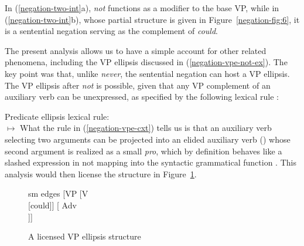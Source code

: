 \documentclass[output=paper
 	        ,biblatex
                ,babelshorthands
                ,newtxmath
                ,draftmode
                ,colorlinks, citecolor=brown
]{langscibook}
\begin{document}
\begin{exe}
\begin{xlist}
\begin{exe}
\begin{xlist}
\eal
\label{negation-two-int}
\zl
%
In (\ref{negation-two-int}a), \textit{not} functions as a modifier to
the base VP, while  in (\ref{negation-two-int}b), whose partial structure is
given in Figure~\ref{negation-fig:6}, it is a sentential
negation serving as the complement of \emph{could}.

The present analysis allows us to have a simple account for other related phenomena,
including the VP ellipsis discussed in (\ref{negation-vpe-not-ex}). The key point
was that, unlike \textit{never}, the sentential negation can
host a VP ellipsis.  The VP ellipsis after \textit{not} is
possible, given that any VP complement of an auxiliary
verb can be unexpressed, as
specified by the following lexical rule \parencites{Kim:00}[]{kimmichaelis:2020}:


\ea
\label{negation-vpe-cxt}
Predicate ellipsis lexical rule:\\
  $\mapsto$
\z
%
%
What the rule in (\ref{negation-vpe-cxt}) tells us is that an auxiliary verb selecting two arguments
can be projected into an elided auxiliary verb () whose second argument
is realized as a small \emph{pro}, which by definition
behaves like a slashed expression in not mapping into the syntactic grammatical
 function \COMPS. This analysis would then license
the structure in Figure~\ref{negation-could-not}.
%
%
%
%
\begin{figure}
	\begin{forest}
		sm edges
		[VP
			[V\\
					[could]]
			[ Adv\\
					[not]]]
	\end{forest}
\caption{A licensed VP ellipsis structure}\label{negation-could-not}
\end{figure}


\end{xlist}
\end{exe}
\end{xlist}
\end{exe}
\end{document}
